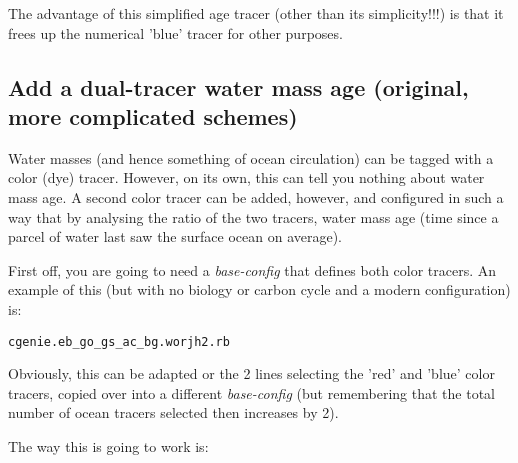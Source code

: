 \documentclass[11pt,fleqn]{book} %
\begin{document}
The advantage of this simplified age tracer (other than its simplicity!!!) is that it frees up the numerical 'blue' tracer for other purposes.

%
\subsection*{Add a dual-tracer water mass age  (original, more complicated schemes)}
\vspace{1mm}

Water masses (and hence something of ocean circulation) can be tagged with a color (dye) tracer. However, on its own, this can tell you nothing about water mass age. A second color tracer can be added, however, and configured in such a way that by analysing the ratio of the two tracers, water mass age (time since a parcel of water last saw the surface ocean on average).

First off, you are going to need a \textit{base-config} that defines both color tracers. An example of this (but with no biology or carbon cycle and a modern configuration) is:
\vspace{-2pt}\begin{verbatim}
cgenie.eb_go_gs_ac_bg.worjh2.rb
\end{verbatim}\vspace{-2pt}
Obviously, this can be adapted or the 2 lines selecting the 'red' and 'blue' color tracers, copied over into a different \textit{base-config} (but remembering that the total number of ocean tracers selected then increases by 2).

The way this is going to work is:
\end{document}
